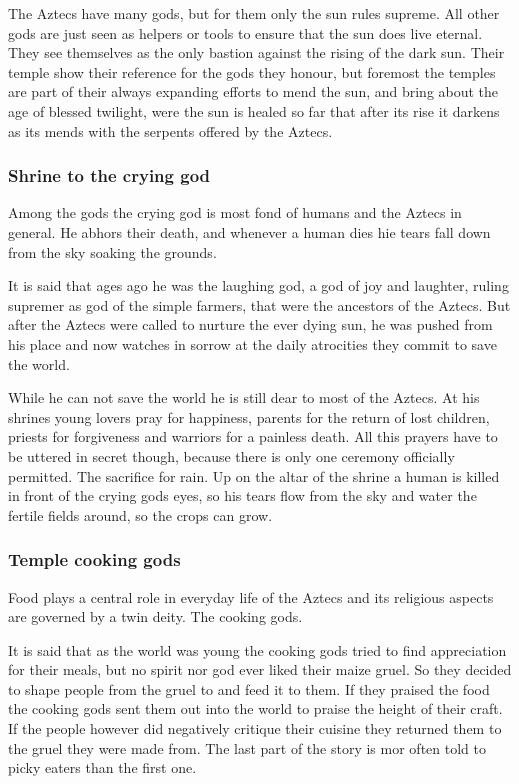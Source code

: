 \documentclass[a4paper]{book}
\begin{document}
		The \gls{Aztecs} have many gods, but for them only the sun rules supreme.
		All other gods are just seen as helpers or tools to ensure that the sun does live eternal.
		They see themselves as the only bastion against the rising of the dark sun.
		Their temple show their reference for the gods they honour,
		but foremost the temples are part of their always expanding efforts to mend the sun,
		and bring about the age of blessed twilight,
		were the sun is healed so far that after its rise it darkens as its mends with the
		serpents offered by the \gls{Aztecs}.

		\subsubsection{Shrine to the crying god}
			Among the gods the crying god is most fond of humans and the \gls{Aztecs} in general.
			He abhors their death, and whenever a human dies hie tears fall down from the sky
			soaking the grounds.

			It is said that ages ago he was the laughing god, a god of joy and laughter,
			ruling supremer as god of the simple farmers,
			that were the ancestors of the \gls{Aztecs}.
			But after the \gls{Aztecs} were called to nurture the ever dying sun,
			he was pushed from his place and now watches in sorrow at the daily atrocities they
			commit to save the world.

			While he can not save the world he is still dear to most of the \gls{Aztecs}.
			At his shrines young lovers pray for happiness,
			parents for the return of lost children,
			priests for forgiveness and warriors for a painless death.
			All this prayers have to be uttered in secret though,
			because there is only one ceremony officially permitted.
			The sacrifice for rain.
			Up on the altar of the shrine a human is killed in front of the crying gods eyes,
			so his tears flow from the sky and water the fertile fields around,
			so the crops can grow.

		\subsubsection{Temple cooking gods}
			Food plays a central role in everyday life of the \gls{Aztecs}
			and its religious aspects are governed by a twin deity.
			The cooking gods.

			It is said that as the world was young the cooking gods tried to find
			appreciation for their meals, but no spirit nor god ever liked their maize gruel.
			So they decided to shape people from the gruel to and feed it to them.
			If they praised the food the cooking gods sent them out into the world to
			praise the height of their craft.
			If the people however did negatively critique their cuisine they returned them
			to the gruel they were made from.
			The last part of the story is mor often told to picky eaters than the first one.
\end{document}
